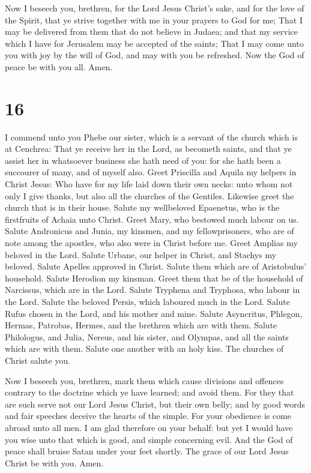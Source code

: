  Now I beseech you, brethren, for the Lord Jesus Christ's
sake, and for the love of the Spirit, that ye strive together with me in
your prayers to God for me;  That I may be delivered from
them that do not believe in Judaea; and that my service which I have for
Jerusalem may be accepted of the saints;  That I may come
unto you with joy by the will of God, and may with you be refreshed.
 Now the God of peace be with you all. Amen.

\hypertarget{section-15}{%
\section{16}\label{section-15}}

 I commend unto you Phebe our sister, which is a servant
of the church which is at Cenchrea:  That ye receive her
in the Lord, as becometh saints, and that ye assist her in whatsoever
business she hath need of you: for she hath been a succourer of many,
and of myself also.  Greet Priscilla and Aquila my helpers
in Christ Jesus:  Who have for my life laid down their own
necks: unto whom not only I give thanks, but also all the churches of
the Gentiles.  Likewise greet the church that is in their
house. Salute my wellbeloved Epaenetus, who is the firstfruits of Achaia
unto Christ.  Greet Mary, who bestowed much labour on us.
 Salute Andronicus and Junia, my kinsmen, and my
fellowprisoners, who are of note among the apostles, who also were in
Christ before me.  Greet Amplias my beloved in the Lord.
 Salute Urbane, our helper in Christ, and Stachys my
beloved.  Salute Apelles approved in Christ. Salute them
which are of Aristobulus' household.  Salute Herodion my
kinsman. Greet them that be of the household of Narcissus, which are in
the Lord.  Salute Tryphena and Tryphosa, who labour in
the Lord. Salute the beloved Persis, which laboured much in the Lord.
 Salute Rufus chosen in the Lord, and his mother and
mine.  Salute Asyncritus, Phlegon, Hermas, Patrobas,
Hermes, and the brethren which are with them.  Salute
Philologus, and Julia, Nereus, and his sister, and Olympas, and all the
saints which are with them.  Salute one another with an
holy kiss. The churches of Christ salute you.

 Now I beseech you, brethren, mark them which cause
divisions and offences contrary to the doctrine which ye have learned;
and avoid them.  For they that are such serve not our
Lord Jesus Christ, but their own belly; and by good words and fair
speeches deceive the hearts of the simple.  For your
obedience is come abroad unto all men. I am glad therefore on your
behalf: but yet I would have you wise unto that which is good, and
simple concerning evil.  And the God of peace shall
bruise Satan under your feet shortly. The grace of our Lord Jesus Christ
be with you. Amen.

